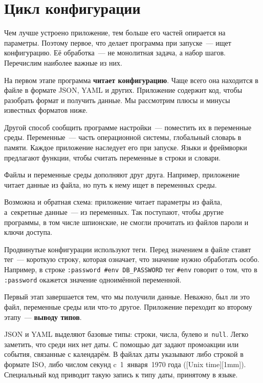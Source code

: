 \section{Цикл конфигурации}

Чем лучше устроено приложение, тем больше его частей опирается на параметры.
Поэтому первое, что делает программа при запуске~--- ищет конфигурацию. Её
обработка~--- не монолитная задача, а набор шагов. Перечислим наиболее важные из
них.

На первом этапе программа \textbf{читает конфигурацию}. Чаще всего она находится
в файле в формате JSON, YAML и других. Приложение содержит код, чтобы разобрать
формат и получить данные. Мы рассмотрим плюсы и минусы известных форматов ниже.

Другой способ сообщить программе настройки~--- поместить их в переменные среды.
Переменные~--- часть операционной системы, глобальный словарь в памяти. Каждое
приложение наследует его при запуске. Языки и фреймворки предлагают функции,
чтобы считать переменные в строки и словари.

Файлы и переменные среды дополняют друг друга. Например, приложение читает
данные из файла, но путь к нему ищет в переменных среды.

Возможна и обратная схема: приложение читает параметры из файла, а~секретные
данные~--- из переменных. Так поступают, чтобы другие программы, в том числе
шпионские, не смогли прочитать из файлов пароли и ключи доступа.


Продвинутые конфигурации используют теги. Перед значением в файле ставят тег~---
короткую строку, которая означает, что значение нужно обработать особо.
Например, в строке \verb|:password #env DB_PASSWORD| тег \verb|#env| говорит о
том, что в \verb|:password| окажется значение одноимённой переменной.

Первый этап завершается тем, что мы получили данные. Неважно, был ли это файл,
переменные среды или что-то другое. Приложение переходит ко второму этапу~---
\textbf{выводу типов}.


JSON и YAML выделяют базовые типы: строки, числа, булево и~\verb|null|. Легко
заметить, что среди них нет даты. С помощью дат задают промоакции или события,
связанные с календарём. В файлах даты указывают либо строкой в формате ISO, либо
числом секунд c~1~января~1970 года ([Unix time][1mm]).
Специальный код приводит такую запись к типу даты, принятому в языке.

